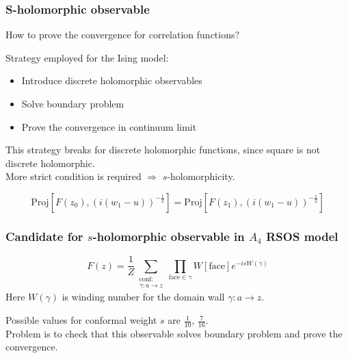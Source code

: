 \documentclass[pdftex]{beamer}
\theoremstyle{definition} \newtheorem{Def}{Definition}
\begin{document}
\begin{frame}
  \frametitle{ S-holomorphic observable}
  How to prove the convergence for correlation functions?

  Strategy employed for the Ising model:
  \begin{itemize}
  \item Introduce discrete holomorphic observables
  \item Solve boundary problem
  \item Prove the convergence in continuum limit
  \end{itemize}
  This strategy breaks for discrete holomorphic functions, since square is not discrete holomorphic. \\
  More strict condition is required $\Rightarrow$ $s$-holomorphicity.
  \begin{figure}[h]
    \label{fig:phase-diagram}
  \end{figure}
  \begin{equation}
    \label{eq:14}
    \mathrm{Proj}\left[F(z_{0}), (i(w_{1}-u))^{-\frac{1}{2}}\right] = \mathrm{Proj}\left[F(z_{1}), (i(w_{1}-u))^{-\frac{1}{2}}\right] 
  \end{equation}
\end{frame}
\begin{frame}
  \frametitle{Candidate for $s$-holomorphic observable in $A_{4}$ RSOS model}
  \begin{equation}
    \label{eq:6}
    F(z)=\frac{1}{Z}\sum_{\substack{\mathrm{conf}:\\\gamma:a\to z}} \prod_{\mathrm{face}\in \gamma}W[\mathrm{face}] e^{-i s W(\gamma)}
  \end{equation}
  Here $W(\gamma)$ is winding number for the domain wall $\gamma:a\to z$. 

  Possible values for conformal weight $s$ are $\frac{1}{10}$, $\frac{7}{16}$. \\
  \vspace{1cm}
  Problem is to check that this observable solves boundary problem and prove the convergence. 
\end{frame}
\end{document}
